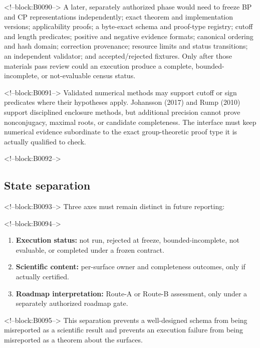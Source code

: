 \documentclass[11pt,a4paper]{article}
\providecommand{\tightlist}{\setlength{\itemsep}{0pt}\setlength{\parskip}{0pt}}
\begin{document}
<!--block:B0090-->
A later, separately authorized phase would need to freeze BP and CP representations independently; exact theorem and implementation versions; applicability proofs; a byte-exact schema and proof-type registry; cutoff and length predicates; positive and negative evidence formats; canonical ordering and hash domain; correction provenance; resource limits and status transitions; an independent validator; and accepted/rejected fixtures. Only after those materials pass review could an execution produce a complete, bounded-incomplete, or not-evaluable census status.

<!--block:B0091-->
Validated numerical methods may support cutoff or sign predicates where their hypotheses apply. Johansson (2017)
\citep{P33-S17}
 and Rump (2010)
\citep{P33-S18}
 support disciplined enclosure methods, but additional precision cannot prove nonconjugacy, maximal roots, or candidate completeness. The interface must keep numerical evidence subordinate to the exact group-theoretic proof type it is actually qualified to check.

<!--block:B0092-->
\hypertarget{state-separation}{%
\subsection{State separation}\label{state-separation}}

<!--block:B0093-->
Three axes must remain distinct in future reporting:

<!--block:B0094-->
\begin{enumerate}
\def\labelenumi{\arabic{enumi}.}
\tightlist
\item
  \textbf{Execution status:} not run, rejected at freeze, bounded-incomplete, not evaluable, or completed under a frozen contract.
\item
  \textbf{Scientific content:} per-surface owner and completeness outcomes, only if actually certified.
\item
  \textbf{Roadmap interpretation:} Route-A or Route-B assessment, only under a separately authorized roadmap gate.
\end{enumerate}

<!--block:B0095-->
This separation prevents a well-designed schema from being misreported as a scientific result and prevents an execution failure from being misreported as a theorem about the surfaces.
\end{document}
